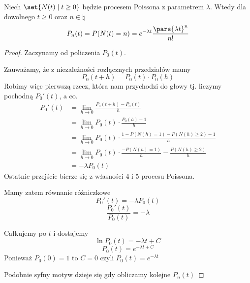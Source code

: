 \begin{theorem}[Twierdzenie 8.7 P\&C]
    Niech \( \set{N(t) \mid t \geq 0} \) będzie procesem Poissona z parametrem \( \lambda \). Wtedy dla dowolnego \( t \geq 0 \) oraz \( n \in \natural \)
    \[ 
        P_n(t) = P(N(t) = n) = e^{-\lambda t} \frac{\pars{\lambda t}^n}{n!}
    \]
\end{theorem}
\begin{proof}
    Zaczynamy od policzenia \( P_0(t) \). 
    
    Zauważamy, że z niezależności rozłącznych przedziałów mamy
    \[
        P_0(t + h) = P_0(t) \cdot P_0(h)
    \]
    Robimy więc pierwszą rzecz, która nam przychodzi do głowy tj. liczymy pochodną \( P_0'(t) \), a co.
    \begin{align*}
        P_0'(t)
            &= \lim_{h \rightarrow 0} \frac{P_0(t + h) - P_0(t)}{h} \\
            &= \lim_{h \rightarrow 0} P_0(t) \cdot \frac{P_0(h) - 1}{h} \\
            &= \lim_{h \rightarrow 0} P_0(t) \cdot \frac{1 - P(N(h) = 1) - P(N(h) \geq 2) - 1}{h} \\
            &= \lim_{h \rightarrow 0} P_0(t) \cdot \frac{- P(N(h) = 1)}{h} - \frac{P(N(h) \geq 2)}{h} \\
            &= -\lambda P_0(t)
    \end{align*}
    Ostatnie przejście bierze się z własności 4 i 5 procesu Poissona.
    
    Mamy zatem równanie różniczkowe
    \[
        P_0'(t) = -\lambda P_0(t)
    \]
    \[
        \frac{P_0'(t)}{P_0(t)} = -\lambda
    \]
    
    Całkujemy po \( t \) i dostajemy
    \[
        \ln P_0(t) = -\lambda t + C
    \]
    \[
        P_0(t) = e^{-\lambda t + C}
    \]
    Ponieważ \( P_0(0) = 1 \) to \( C = 0\) czyli \( P_0(t) = e^{-\lambda t} \)
    
    Podobnie syfny motyw dzieje się gdy obliczamy kolejne \( P_n(t) \)
    

\end{proof}
